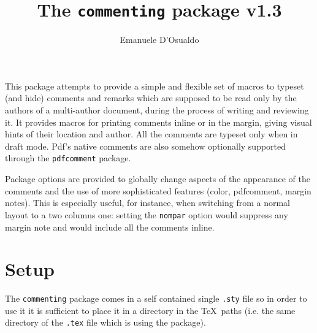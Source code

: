 \documentclass[11pt]{article}
\let\cmd=\lstinline
\begin{document}
\author{Emanuele D'Osualdo}
\title{The \texttt{commenting} package v1.3}
\maketitle
%

This package attempts to provide a simple and flexible set of macros to typeset
(and hide) comments and remarks which are supposed to be read only by the
authors of a multi-author document, during the process of writing and reviewing
it. It provides macros for printing comments inline or in the margin, giving
visual hints of their location and author. All the comments are typeset only
when in draft mode. Pdf's native comments are also somehow optionally supported
through the \cmd'pdfcomment' package.


Package options are provided to globally change aspects of the appearance of the
comments and the use of more sophisticated features (color, pdfcomment, margin
notes). This is especially useful, for instance, when switching from a normal
layout to a two columns one: setting the \cmd'nompar' option would suppress any
margin note and would include all the comments inline.

\section{Setup}

The \texttt{commenting} package comes in a self contained single
\verb'.sty' file so in order to use it it is sufficient to place it in a directory in the
\TeX\ paths (i.e. the same directory of the \verb'.tex' file which is using
the package).
\end{document}
